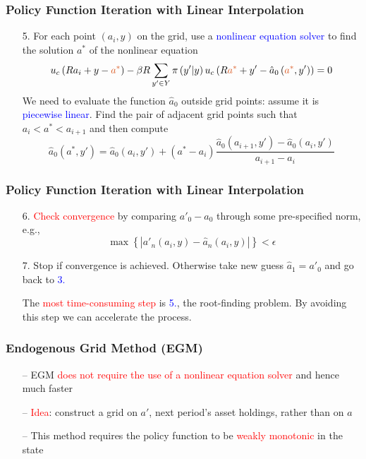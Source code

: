 \documentclass[aspectratio=169, 11pt]{beamer}
\begin{document}
\begin{frame}
\frametitle{Policy Function Iteration with Linear Interpolation}
  \begin{itemize}
    \item[5.] For each point $\left(a_{i},y\right)$ on the grid, use a \textcolor{blue}{nonlinear equation solver} to find the solution $a^{*}$ of the nonlinear equation
    \[
      u_{c}\left(Ra_{i}+y-\textcolor{red}{a^{*}}\right)-\beta R\sum_{y'\in Y}\pi\left(y'|y\right)u_{c}\left(R\textcolor{red}{a^{*}}+y'-\hat{a}_{0}\left(\textcolor{red}{a^{*}},y'\right)\right)=0
    \]
    We need to evaluate the function $\hat{a}_{0}$ outside grid points: assume it is \textcolor{blue}{piecewise linear}. Find the pair of adjacent grid points such that $a_{i}<a^{*}<a_{i+1}$ and then compute
    \[
      \hat{a}_{0}\left(a^{*},y'\right)=\hat{a}_{0}\left(a_{i},y'\right)+\left(a^{*}-a_{i}\right)\frac{\hat{a}_{0}\left(a_{i+1},y'\right)-\hat{a}_{0}\left(a_{i},y'\right)}{a_{i+1}-a_{i}}
    \]
  \end{itemize}
\end{frame}

\begin{frame}
\frametitle{Policy Function Iteration with Linear Interpolation}
  \begin{itemize}
    \item[6.] \textcolor{red}{Check convergence} by comparing $a'_{0}-\hat{a}_{0}$ through some pre-specified norm, e.g.,
    \[
      \max\left\{ \left|a'_{n}\left(a_{i},y\right)-\hat{a}_{n}\left(a_{i},y\right)\right|\right\} <\epsilon
    \]
    \item[7.] Stop if convergence is achieved. Otherwise take new guess $\hat{a}_{1}=a'_{0}$ and go back to \textcolor{blue}{3.}

    \bigskip
    The \textcolor{red}{most time-consuming step} is \textcolor{blue}{5.}, the root-finding problem. By avoiding this step we can accelerate the process.
  \end{itemize}
\end{frame}

\begin{frame}
\frametitle{Endogenous Grid Method (EGM)}
  \begin{itemize}
    \item[--] EGM \textcolor{red}{does not require the use of a nonlinear equation solver} and hence much faster
    \bigskip
    \item[--] \textcolor{red}{Idea}: construct a grid on $a'$, next period's asset holdings, rather than on $a$
    \bigskip
    \item[--] This method requires the policy function to be \textcolor{red}{weakly monotonic} in the state
  \end{itemize}
\end{frame}
\end{document}
